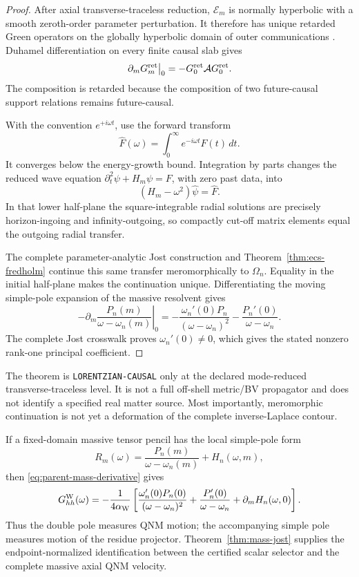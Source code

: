 \documentclass[11pt]{article}
\theoremstyle{remark}
\begin{document}
\begin{proof}
After axial transverse-traceless reduction,
\(\mathcal E_m\) is normally hyperbolic with a smooth zeroth-order
parameter perturbation.  It therefore has unique retarded Green operators
on the globally hyperbolic domain of outer communications
\cite{baergreenhyperbolic}.  Duhamel differentiation on every finite
causal slab gives
\[
 \left.\partial_mG_m^{\rm ret}\right|_0
 =-G_0^{\rm ret}\mathcal A G_0^{\rm ret}.
\]
The composition is retarded because the composition of two future-causal
support relations remains future-causal.

With the convention \(e^{+i\omega t}\), use the forward transform
\[
 \widehat F(\omega)
 =\int_0^\infty e^{-i\omega t}F(t)\,dt.
\]
It converges below the energy-growth bound.  Integration by parts changes
the reduced wave equation
\(\partial_t^2\psi+H_m\psi=F\), with zero past data, into
\[
 (H_m-\omega^2)\widehat\psi=\widehat F.
\]
In that lower half-plane the square-integrable radial solutions are
precisely horizon-ingoing and infinity-outgoing, so compactly cut-off
matrix elements equal the outgoing radial transfer.

The complete parameter-analytic Jost construction and
Theorem~\ref{thm:ecs-fredholm} continue this same transfer meromorphically
to \(\Omega_n\).  Equality in the initial half-plane makes the continuation
unique.  Differentiating the moving simple-pole expansion of the massive
resolvent gives
\[
 -\left.\partial_m
 \frac{P_n(m)}{\omega-\omega_n(m)}\right|_0
 =
 -\frac{\omega_n'(0)P_n}{(\omega-\omega_n)^2}
 -\frac{P_n'(0)}{\omega-\omega_n}.
\]
The complete Jost crosswalk proves \(\omega_n'(0)\ne0\), which gives the
stated nonzero rank-one principal coefficient.
\end{proof}

The theorem is \texttt{LORENTZIAN-CAUSAL} only at the declared
mode-reduced transverse-traceless level.  It is not a full off-shell
metric/BV propagator and does not identify a specified real matter source.
Most importantly, meromorphic continuation is not yet a deformation of
the complete inverse-Laplace contour.

If a fixed-domain massive tensor pencil has the local simple-pole form
\[
 R_m(\omega)=
 \frac{P_n(m)}{\omega-\omega_n(m)}+H_n(\omega,m),
\]
then \eqref{eq:parent-mass-derivative} gives
\[
 G_{hh}^{\rm W}(\omega)
 =-\frac1{4\alpha_{\rm W}}
 \left[
 \frac{\omega_n'(0)P_n(0)}
 {(\omega-\omega_n)^2}
 +\frac{P_n'(0)}
 {\omega-\omega_n}
 +\partial_mH_n(\omega,0)
 \right].
\]
Thus the double pole measures QNM motion; the accompanying simple pole
measures motion of the residue projector.  Theorem~\ref{thm:mass-jost}
supplies the endpoint-normalized identification between the certified
scalar selector and the complete massive axial QNM velocity.
\end{document}
